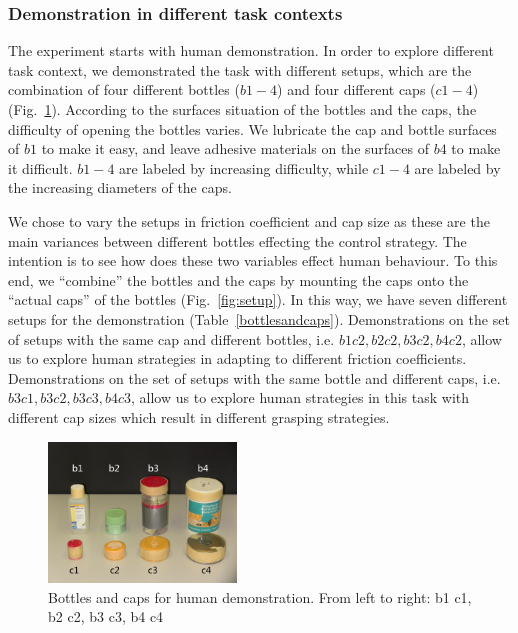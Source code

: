 \documentclass[preprint,12pt]{elsarticle}
\begin{document}
\subsubsection{Demonstration in different task contexts}
\label{sec:exp_context}
The experiment starts with human demonstration. In order to explore different task context, we demonstrated the task with different setups, which are the combination of four different bottles ($b1-4$) and four different caps ($c1-4$) (Fig.~\ref{fig:b_c}). According to the surfaces situation of the bottles and the caps, the difficulty of opening the bottles varies. We lubricate the cap and bottle surfaces of $b1$ to make it easy, and leave adhesive materials on the surfaces of $b4$ to make it difficult. $b1-4$ are labeled by increasing difficulty, while $c1-4$ are labeled by the increasing diameters of the caps.


We chose to vary the setups in friction coefficient and cap size as these are the main variances between different bottles effecting the control strategy. The intention is to see how does these two variables effect human behaviour. To this end, we ``combine'' the bottles and the caps by mounting the caps onto the ``actual caps'' of the bottles (Fig.~\ref{fig:setup}). In this way, we have seven different setups for the demonstration (Table~\ref{bottlesandcaps}). Demonstrations on the set of setups with the same cap and different bottles, i.e. $b1c2, b2c2, b3c2, b4c2$, allow us to explore human strategies in adapting to different friction coefficients. Demonstrations on the set of setups with the same bottle and different caps, i.e. $b3c1, b3c2, b3c3, b4c3$, allow us to explore human strategies in this task with different cap sizes which result in different grasping strategies.

\begin{figure}
  \centering
  \includegraphics[width=5cm]{./fig/b_c.jpg}
  \caption{ \scriptsize{Bottles and caps for human demonstration. From left to right: b1 c1, b2 c2, b3 c3, b4  c4}
}
\label{fig:b_c}
\end{figure}
\end{document}
